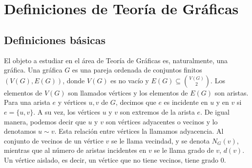 \chapter{Definiciones de Teor\'ia de Gr\'aficas}%
\label{cap:defs grafs}

\section{Definiciones b\'asicas}%
\label{sec:def-basicas}

El objeto a estudiar en el \'area de Teor\'ia de Gr\'aficas es, naturalmente,
una gr\'afica. Una gr\'afica $G$ es una pareja ordenada de conjuntos finitos
$(V(G), E(G))$, donde $V(G)$ es no vac\'io y $E(G) \subseteq \binom{V(G)}{2}$.
Los elementos de $V(G)$ son llamados v\'ertices y los elementos de $E(G)$ son
aristas. Para una arista $e$ y v\'ertices $u, v$ de $G$, decimos que $e$ es
incidente en $u$ y en $v$ si $e= \{u, v\}$. A su vez, los v\'ertices $u$ y $v$
son extremos de la arista $e$. De igual manera, podemos decir que $u$ y $v$ son
v\'ertices adyacentes o vecinos y lo denotamos $u \sim v$. Esta relaci\'on entre
v\'ertices la llamamos adyacencia. Al conjunto de vecinos de un v\'ertice $v$ se
le llama vecindad, y se denota $N_G(v)$, mientras que al n\'umero de aristas
incidentes en $v$ se le llama grado de $v$, $d(v)$. Un v\'ertice aislado, es
decir, un v\'ertice que no tiene vecinos, tiene grado $0$.

